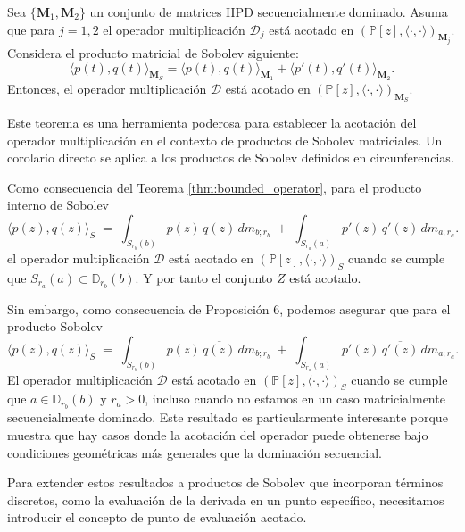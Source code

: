 \begin{theorem}\label{thm:bounded_operator}
  \cite{escribano2025boundedness} Sea $\{\textbf{M}_1,\textbf{M}_2\}$ un conjunto de matrices HPD secuencialmente dominado. Asuma que para $j=1,2$ el operador multiplicación $\mathcal{D}_j$ está acotado en $(\mathbb{P}[z],\langle \cdot,\cdot \rangle)_{\textbf{M}_j}$. Considera el producto matricial de Sobolev siguiente:
  $$\langle p(t),q(t) \rangle_{\textbf{M}_S}=\langle p(t),q(t) \rangle_{\textbf{M}_1}+\langle p'(t),q'(t) \rangle_{\textbf{M}_2}.$$
  Entonces, el operador multiplicación $\mathcal{D}$ está acotado en $(\mathbb{P}[z],\langle \cdot,\cdot \rangle)_{\textbf{M}_S}.$
\end{theorem}

Este teorema es una herramienta poderosa para establecer la acotación del operador multiplicación en el contexto de productos de Sobolev matriciales. Un corolario directo se aplica a los productos de Sobolev definidos en circunferencias.

\begin{corollary}\label{cor:seq_dominated_sobolev}
  Como consecuencia del Teorema \ref{thm:bounded_operator}, para el producto interno de Sobolev
  $$\langle p(z) , q(z) \rangle_{S}\;=\;
    \int_{S_{r_b}(b)} p(z)\,\overline{q(z)} \, dm_{b;r_b}
    \;+\;
    \int_{S_{r_a}(a)} p'(z)\,\overline{q'(z)} \, dm_{a;r_a}.$$
  el operador multiplicación $\mathcal{D}$ está acotado en $(\mathbb{P}[z],\langle \cdot,\cdot \rangle)_{S}$ cuando se cumple que $S_{r_a}(a)\subset \mathbb{D}_{r_b}(b)$. Y por tanto el conjunto $Z$ está acotado.
\end{corollary}

Sin embargo, como consecuencia de \cite{escribano2025zeros} Proposición 6, podemos asegurar que para el producto Sobolev
$$
  \langle p(z) , q(z) \rangle_{S}\;=\;
  \int_{S_{r_b}(b)} p(z)\,\overline{q(z)} \, dm_{b;r_b}
  \;+\;
  \int_{S_{r_a}(a)} p'(z)\,\overline{q'(z)} \, dm_{a;r_a}.
$$
El operador multiplicación $\mathcal{D}$ está acotado en $(\mathbb{P}[z],\langle \cdot,\cdot \rangle)_{S}$ cuando se cumple que $a \in \mathbb{D}_{r_b}(b)$ y $r_a > 0$, incluso cuando no estamos en un caso matricialmente secuencialmente dominado. Este resultado es particularmente interesante porque muestra que hay casos donde la acotación del operador puede obtenerse bajo condiciones geométricas más generales que la dominación secuencial.

Para extender estos resultados a productos de Sobolev que incorporan términos discretos, como la evaluación de la derivada en un punto específico, necesitamos introducir el concepto de punto de evaluación acotado.

